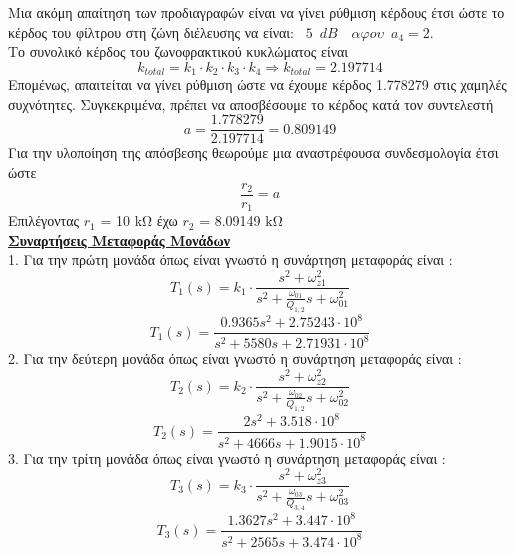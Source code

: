 \documentclass{article}
\begin{document}
{\large{}
Μια ακόμη απαίτηση των προδιαγραφών είναι να γίνει ρύθμιση κέρδους έτσι ώστε το κέρδος του φίλτρου
στη ζώνη διέλευσης να είναι: $\boxed{\enspace 5 \enspace dB \enspace} \enspace αφου \enspace a_4 =2$.  \\
Το συνολικό κέρδος του ζωνοφρακτικού κυκλώματος είναι 
\begin{equation*}
k_{total} = k_1 \cdot k_2 \cdot k_3 \cdot k_4 \Rightarrow \boxed{k_{total} = 2.197714}
\end{equation*}
Επομένως, απαιτείται να γίνει ρύθμιση ώστε να έχουμε κέρδος 1.778279 στις χαμηλές συχνότητες. Συγκεκριμένα, πρέπει να αποσβέσουμε το κέρδος κατά τον συντελεστή
\begin{equation*}
a = \frac{1.778279}{2.197714} = 0.809149
\end{equation*}
Για την υλοποίηση της απόσβεσης θεωρούμε μια αναστρέφουσα συνδεσμολογία έτσι ώστε
\begin{equation*}
\frac{r_2}{r_1} = a
\end{equation*}
Επιλέγοντας $r_1$ = 10 kΩ έχω $r_2$ = 8.09149 kΩ \\[0.4\baselineskip]
\large{ \underline{\textbf{Συναρτήσεις Μεταφοράς Μονάδων}} \\[0.4\baselineskip]
\large{}
1. Για την πρώτη μονάδα όπως είναι γνωστό η συνάρτηση μεταφοράς είναι :
\begin{equation*}
T_1(s) = k_1 \cdot \frac{s^2 + ω_{z1}^2}{s^2 + \frac{ω_{01}}{Q_{1,2}}s + ω_{01}^2}
\end{equation*}
\begin{equation*}
\boxed{
T_1(s) = \frac{0.9365s^2+ 2.75243 \cdot 10^8}{s^2 +5580s+2.71931\cdot10^8}}
\end{equation*}
2. Για την δεύτερη μονάδα όπως είναι γνωστό η συνάρτηση μεταφοράς είναι :
\begin{equation*}
T_2(s) =  k_2 \cdot  \frac{s^2 + ω_{z2}^2}{s^2 + \frac{ω_{02}}{Q_{1,2}}s + ω_{02}^2}
\end{equation*}
\begin{equation*}
\boxed{
T_2(s) = \frac{2s^2+ 3.518 \cdot 10^8}{s^2 +4666s+1.9015\cdot10^8}}
\end{equation*}
3. Για την τρίτη μονάδα όπως είναι γνωστό η συνάρτηση μεταφοράς είναι :
\begin{equation*}
T_3(s) =   k_3 \cdot \frac{s^2 + ω_{z3}^2}{s^2 + \frac{ω_{03}}{Q_{3,4}}s + ω_{03}^2}
\end{equation*}
\begin{equation*}
\boxed{
T_3(s) =  \frac{1.3627s^2+ 3.447 \cdot 10^8}{s^2 +2565s+ 3.474\cdot10^8}}

\end{equation*}}}
\end{document}
